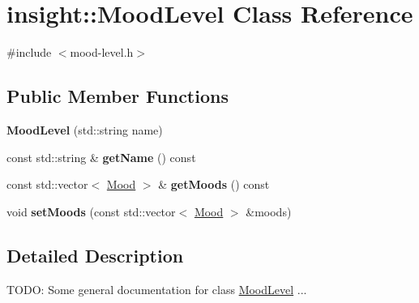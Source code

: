 \hypertarget{classinsight_1_1MoodLevel}{}\section{insight\+:\+:Mood\+Level Class Reference}
\label{classinsight_1_1MoodLevel}


{\ttfamily \#include $<$mood-\/level.\+h$>$}

\subsection*{Public Member Functions}
\begin{DoxyCompactItemize}
\item 
{\bfseries Mood\+Level} (std\+::string name)\hypertarget{classinsight_1_1MoodLevel_ac6badf0f3cad7994d4d92848081cb33a}{}\label{classinsight_1_1MoodLevel_ac6badf0f3cad7994d4d92848081cb33a}

\item 
const std\+::string \& {\bfseries get\+Name} () const \hypertarget{classinsight_1_1MoodLevel_a321a08dc9580259b22f30855cefea4f3}{}\label{classinsight_1_1MoodLevel_a321a08dc9580259b22f30855cefea4f3}

\item 
const std\+::vector$<$ \hyperlink{classinsight_1_1Mood}{Mood} $>$ \& {\bfseries get\+Moods} () const \hypertarget{classinsight_1_1MoodLevel_a1d6d1ebde3aa3bfdc1a7857c89123cd9}{}\label{classinsight_1_1MoodLevel_a1d6d1ebde3aa3bfdc1a7857c89123cd9}

\item 
void {\bfseries set\+Moods} (const std\+::vector$<$ \hyperlink{classinsight_1_1Mood}{Mood} $>$ \&moods)\hypertarget{classinsight_1_1MoodLevel_a485260271b46f24cecc2df53869d59c9}{}\label{classinsight_1_1MoodLevel_a485260271b46f24cecc2df53869d59c9}

\end{DoxyCompactItemize}


\subsection{Detailed Description}
T\+O\+DO\+: Some general documentation for class \hyperlink{classinsight_1_1MoodLevel}{Mood\+Level} ... 